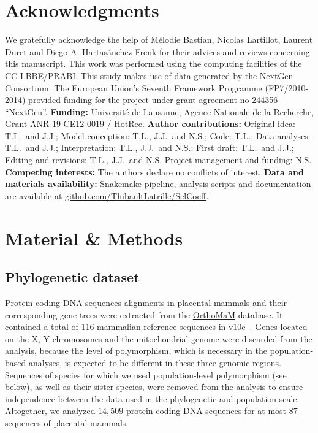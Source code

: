 \documentclass{article}
\begin{document}
    \section*{Acknowledgments}
    \label{sec:acknowledgment}
    We gratefully acknowledge the help of Mélodie Bastian, Nicolas Lartillot, Laurent Duret and Diego A. Hartasánchez Frenk for their advices and reviews concerning this manuscript.
    This work was performed using the computing facilities of the CC LBBE/PRABI\@.
    This study makes use of data generated by the NextGen Consortium.
    The European Union’s Seventh Framework Programme (FP7/2010-2014) provided funding for the project under grant agreement no 244356 - “NextGen”.
    \textbf{Funding:}
    Université de Lausanne; Agence Nationale de la Recherche, Grant ANR-19-CE12-0019 / HotRec.
    \textbf{Author contributions:}
    Original idea: T.L.\ and J.J.;
    Model conception: T.L., J.J.\ and N.S.;
    Code: T.L.;
    Data analyses: T.L.\ and J.J.;
    Interpretation: T.L., J.J.\ and N.S.;
    First draft: T.L.\ and J.J.;
    Editing and revisions: T.L., J.J.\ and N.S.
    Project management and funding: N.S\@.
    \textbf{Competing interests:}
    The authors declare no conflicts of interest.
    \textbf{Data and materials availability:}
    Snakemake pipeline, analysis scripts and documentation are available at \href{https://github.com/ThibaultLatrille/SelCoeff}{github.com/ThibaultLatrille/SelCoeff}.


    \section{Material \& Methods}
    \label{sec:methods}

    \subsection{Phylogenetic dataset}

    Protein-coding DNA sequences alignments in placental mammals and their corresponding gene trees were extracted from the \href{https://www.orthomam.univ-montp2.fr}{OrthoMaM} database.
    It contained a total of $116$ mammalian reference sequences in v10c~\cite{ranwez_orthomam_2007, douzery_orthomam_2014, scornavacca_orthomam_2019}.
    Genes located on the X, Y chromosomes and the mitochondrial genome were discarded from the analysis, because the level of polymorphism, which is necessary in the population-based analyses, is expected to be different in these three genomic regions.
    Sequences of species for which we used population-level polymorphism (see below), as well as their sister species, were removed from the analysis to ensure independence between the data used in the phylogenetic and population scale.
    Altogether, we analyzed $14,509$ protein-coding DNA sequences for at most $87$ sequences of placental mammals.
\end{document}
